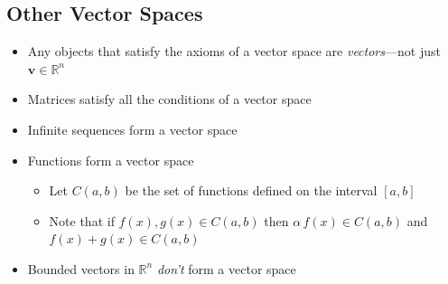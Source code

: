 \begin{slide}
\section{Other Vector Spaces}

\begin{PauseHighLight}
  \begin{itemize}
  \item Any objects that satisfy the axioms of a vector space are
    \textit{vectors}\pause---not just $\bm{v}\in \mathbb{R}^n$\pauseb
  \item Matrices satisfy all the conditions of a vector space\pause
  \item Infinite sequences form a vector space\pause
  \item Functions form a vector space\pause
    \begin{itemize}\squeeze
    \item Let $C(a,b)$ be the set of functions defined on the interval
      $[a,b]$
    \item Note that if $f(x), g(x) \in C(a,b)$ then $\alpha\,f(x) \in C(a,b)$
      and $f(x)+g(x) \in C(a,b)$\pause
    \end{itemize}
  \item Bounded vectors in $\mathbb{R}^n$ \emph{don't} form a vector space\pause
  \end{itemize}
\end{PauseHighLight}

\end{slide}

\Outline

